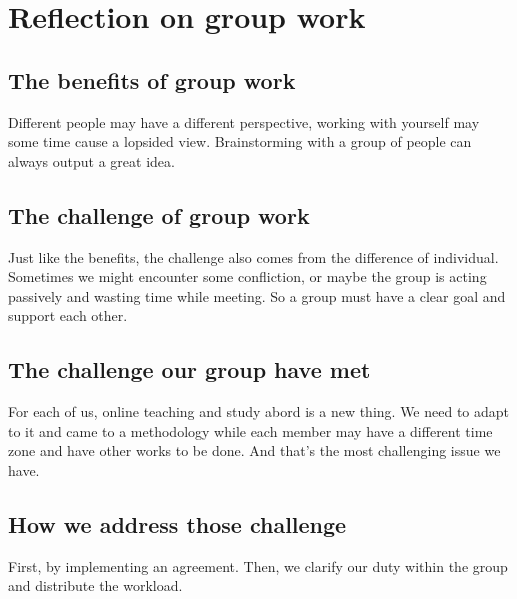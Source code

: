\newpage
\section{Reflection on group work}
\subsection{The benefits of group work}
Different people may have a different perspective, working with yourself may some time cause a lopsided view. Brainstorming with a group of people can always output a great idea.
\subsection{The challenge of group work}
Just like the benefits, the challenge also comes from the difference of individual. Sometimes we might encounter some confliction, or maybe the group is acting passively and wasting time while meeting. So a group must have a clear goal and support each other.
\subsection{The challenge our group have met}
For each of us, online teaching and study abord is a new thing. We need to adapt to it and came to a methodology while each member may have a different time zone and have other works to be done. And that's the most challenging issue we have.
\subsection{How we address those challenge}
First, by implementing an agreement. Then, we clarify our duty within the group and distribute the workload.
